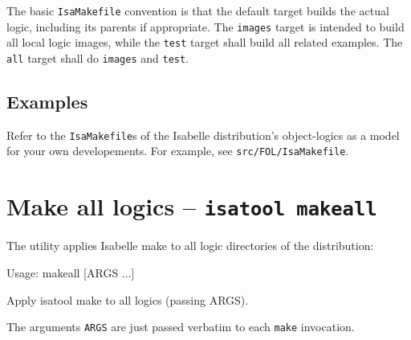 \medskip The basic \texttt{IsaMakefile} convention is that the default
target builds the actual logic, including its parents if appropriate.
The \texttt{images} target is intended to build all local logic
images, while the \texttt{test} target shall build all related
examples.  The \texttt{all} target shall do \texttt{images} and
\texttt{test}.


\subsection*{Examples}

Refer to the \texttt{IsaMakefile}s of the Isabelle distribution's
object-logics as a model for your own developements.  For example, see
\texttt{src/FOL/IsaMakefile}.


\section{Make all logics -- \texttt{isatool makeall}}

The  utility applies Isabelle make to all logic
directories of the distribution:
\begin{ttbox}
Usage: makeall [ARGS ...]

  Apply isatool make to all logics (passing ARGS).
\end{ttbox}
The arguments \texttt{ARGS} are just passed verbatim to each
\texttt{make} invocation.

